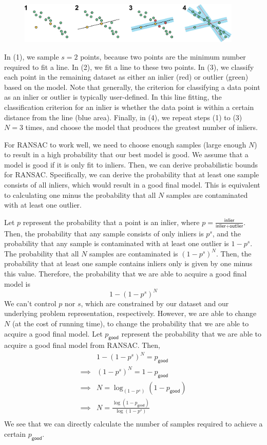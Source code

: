 \documentclass[a4paper, 12pt]{article}
\begin{document}
\begin{figure}[h!]
\centering
\includegraphics[width=0.95\textwidth]{figures/ransac_line}
\end{figure}
In (1), we sample $s = 2$ points, because two points are the minimum number required to fit a line.  In (2), we fit a line to these two points.  In (3), we classify each point in the remaining dataset as either an inlier (red) or outlier (green) based on the model.  Note that generally, the criterion for classifying a data point as an inlier or outlier is typically user-defined.  In this line fitting, the classification criterion for an inlier is whether the data point is within a certain distance from the line (blue area).  Finally, in (4), we repeat steps (1) to (3) $N = 3$ times, and choose the model that produces the greatest number of inliers.

For RANSAC to work well, we need to choose enough samples (large enough $N$) to result in a high probability that our best model is good.  We assume that a model is good if it is only fit to inliers.  Then, we can derive probabilistic bounds for RANSAC.  Specifically, we can derive the probability that at least one sample consists of all inliers, which would result in a good final model.  This is equivalent to calculating one minus the probability that all $N$ samples are contaminated with at least one outlier.

Let $p$ represent the probability that a point is an inlier, where $p = \frac{\textsf{inlier}}{\textsf{inlier} + \textsf{outlier}}$.  Then, the probability that any sample consists of only inliers is $p^s$, and the probability that any sample is contaminated with at least one outlier is $1 - p^s$.  The probability that all $N$ samples are contaminated is $(1 - p^s)^N$.  Then, the probability that at least one sample contains inliers only is given by one minus this value.  Therefore, the probability that we are able to acquire a good final model is
\[
1 - (1 - p^s)^N
\]
We can't control $p$ nor $s$, which are constrained by our dataset and our underlying problem representation, respectively.  However, we are able to change $N$ (at the cost of running time), to change the probability that we are able to acquire a good final model.  Let $p_\textsf{good}$ represent the probability that we are able to acquire a good final model from RANSAC.  Then,
\begin{align*}
& 1 - (1 - p^s)^N = p_\textsf{good} \\
\implies & (1 - p^s)^N = 1 - p_\textsf{good} \\
\implies & N = \log_{(1 - p^s)} (1 - p_\textsf{good}) \\
\implies & \boxed{N = \frac{\log(1 - p_\textsf{good})}{\log(1 - p^s)}} \\
\end{align*}
We see that we can directly calculate the number of samples required to achieve a certain $p_\textsf{good}$.
\end{document}
